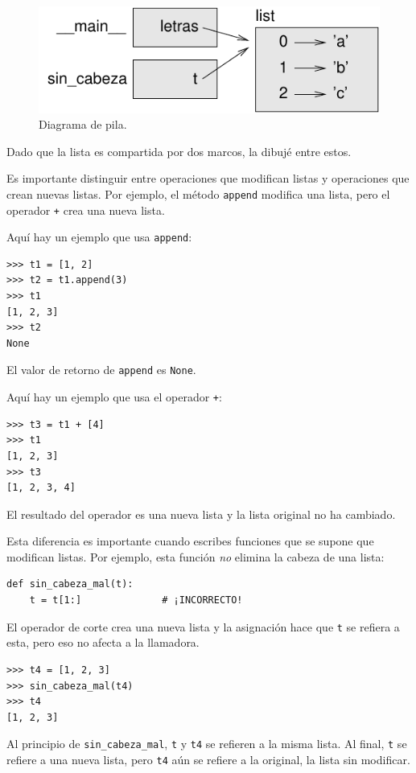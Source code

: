 \documentclass[10pt]{book}
\begin{document}
\begin{figure}
\centerline
{\includegraphics[scale=0.8]{figs/stack5.pdf}}
\caption{Diagrama de pila.}
\label{fig.stack5}
\end{figure}

Dado que la lista es compartida por dos marcos, la dibujé
entre estos.

Es importante distinguir entre operaciones que
modifican listas y operaciones que crean nuevas listas.  Por
ejemplo, el método {\tt append} modifica una lista, pero el
operador {\tt +} crea una nueva lista.

Aquí hay un ejemplo que usa {\tt append}:
%
\begin{verbatim}
>>> t1 = [1, 2]
>>> t2 = t1.append(3)
>>> t1
[1, 2, 3]
>>> t2
None
\end{verbatim}
%
El valor de retorno de {\tt append} es {\tt None}.

Aquí hay un ejemplo que usa el operador {\tt +}:
%
\begin{verbatim}
>>> t3 = t1 + [4]
>>> t1
[1, 2, 3]
>>> t3
[1, 2, 3, 4]
\end{verbatim}
%
El resultado del operador es una nueva lista y la lista original no ha
cambiado.

Esta diferencia es importante cuando escribes funciones que
se supone que modifican listas.  Por ejemplo, esta función
{\em no} elimina la cabeza de una lista:
%
\begin{verbatim}
def sin_cabeza_mal(t):
    t = t[1:]              # ¡INCORRECTO!
\end{verbatim}
%
El operador de corte crea una nueva lista y la asignación
hace que {\tt t} se refiera a esta, pero eso no afecta a la llamadora.
%
\begin{verbatim}
>>> t4 = [1, 2, 3]
>>> sin_cabeza_mal(t4)
>>> t4
[1, 2, 3]
\end{verbatim}
%
Al principio de \verb"sin_cabeza_mal", {\tt t} y {\tt t4}
se refieren a la misma lista.  Al final, {\tt t} se refiere a una nueva lista,
pero {\tt t4} aún se refiere a la original, la lista sin modificar.
\end{document}
